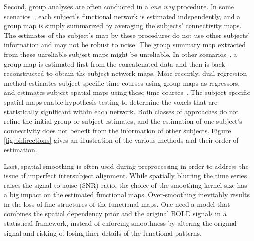 \documentclass[review,authoryear]{elsarticle}
\begin{document}
Second, group analyses are often conducted in a \emph{one way} procedure. In
some scenarios~\citep{van2008normalized, craddock2012whole, greicius2004default,
  greicius2007resting, seeley2009neurodegenerative, mohammadi2009changes}, each
subject's functional network is estimated independently, and a group map is
simply summarized by averaging the subjects' connectivity maps. The estimates of
the subject's map by these procedures do not use other subjects' information and
may not be robust to noise. The group summary map extracted from these
unreliable subject maps might be unreliable. In other
scenarios~\citep{calhoun2001method}, a group map is estimated first from the
concatenated data and then is back-reconstructed to obtain the subject network
maps. More recently, dual regression method estimates subject-specific time
courses using group maps as regressors, and estimates subject spatial maps using
these time courses~\citep{filippini2009distinct,beckmann2009group}. The
subject-specific spatial maps enable hypothesis testing to determine the voxels
that are statistically significant within each network.
Both classes of approaches do not refine the initial group or subject estimates,
and the estimation of one subject's connectivity does not benefit from the
information of other subjects. Figure \ref{fig:bidirections} gives an
illustration of the various methods and their order of estimation.

Last, spatial smoothing is often used during preprocessing in order to address
the issue of imperfect intersubject alignment. While spatially blurring the time
series raises the signal-to-noise (SNR) ratio, the choice of the smoothing kernel size
has a big impact on the estimated functional maps. Over-smoothing inevitably
results in the loss of fine structures of the functional maps. One need a model
that combines the spatial dependency prior and the original BOLD signals in a
statistical framework, instead of enforcing smoothness by altering the original
signal and risking of losing finer details of the functional patterns. 
\end{document}
